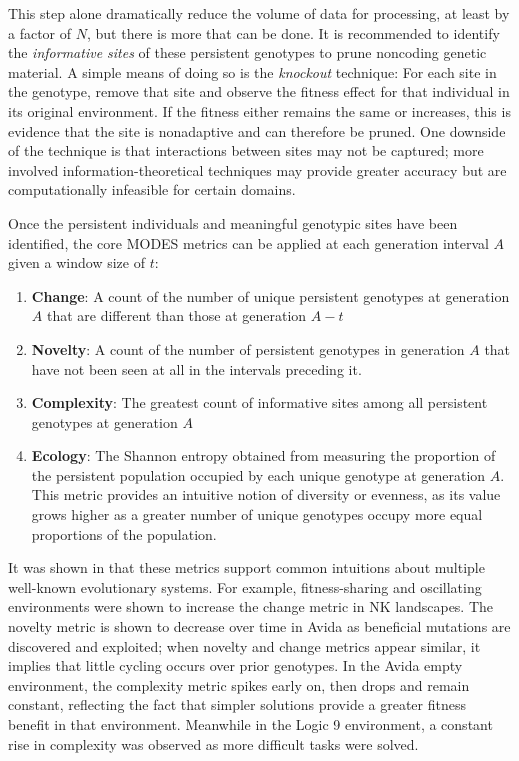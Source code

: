 \documentclass[letterpaper]{article}
\begin{document}
This step alone dramatically reduce the volume of data for processing, at least by a factor of $N$, but there is more that can be done. It is recommended to identify the \textit{informative sites} of these persistent genotypes to prune noncoding genetic material. A simple means of doing so is the \textit{knockout} technique: For each site in the genotype, remove that site and observe the fitness effect for that individual in its original environment. If the fitness either remains the same or increases, this is evidence that the site is nonadaptive and can therefore be pruned. One downside of the technique is that interactions between sites may not be captured; more involved information-theoretical techniques may provide greater accuracy but are computationally infeasible for certain domains.

Once the persistent individuals and meaningful genotypic sites have been identified, the core MODES metrics can be applied at each generation interval $A$ given a window size of $t$:
\begin{enumerate}
    \item \textbf{Change}: A count of the number of unique persistent genotypes at generation $A$ that are different than those at generation $A - t$
    \item \textbf{Novelty}: A count of the number of persistent genotypes in generation $A$ that have not been seen at all in the intervals preceding it.
    \item \textbf{Complexity}: The greatest count of informative sites among all persistent genotypes at generation $A$
    \item \textbf{Ecology}: The Shannon entropy obtained from measuring the proportion of the persistent population occupied by each unique genotype at generation $A$. This metric provides an intuitive notion of diversity or evenness, as its value grows higher as a greater number of unique genotypes occupy more equal proportions of the population. 
\end{enumerate}

It was shown in \cite{dolson2019} that these metrics support common intuitions about multiple well-known evolutionary systems. For example, fitness-sharing and oscillating environments were shown to increase the change metric in NK landscapes. The novelty metric is shown to decrease over time in Avida as beneficial mutations are discovered and exploited; when novelty and change metrics appear similar, it implies that little cycling occurs over prior genotypes. In the Avida empty environment, the complexity metric spikes early on, then drops and remain constant, reflecting the fact that simpler solutions provide a greater fitness benefit in that environment. Meanwhile in the Logic 9 environment, a constant rise in complexity was observed as more difficult tasks were solved. 
\end{document}
